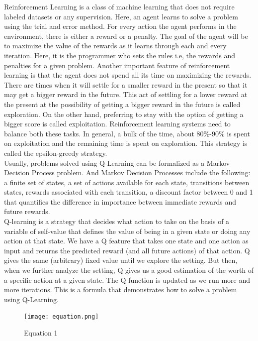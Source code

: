 \documentclass[conference]{IEEEtran}
\begin{document}
Reinforcement Learning is a class of machine learning that does not require labeled datasets or any supervision. Here, an agent learns to solve a problem using the trial and error method. For every action the agent performs in the environment, there is either a reward or a penalty. The goal of the agent will be to maximize the value of the rewards as it learns through each and every iteration. Here, it is the programmer who sets the rules i.e, the rewards and penalties for a given problem. Another important feature of reinforcement learning is that the agent does not spend all its time on maximizing the rewards. There are times when it will settle for a smaller reward in the present so that it may get a bigger reward in the future. This act of settling for a lower reward at the present at the possibility of getting a bigger reward in the future is called exploration. On the other hand, preferring to stay with the option of getting a bigger score is called exploitation. Reinforcement learning systems need to balance both these tasks. In general, a bulk of the time, about 80\%-90\% is spent on exploitation and the remaining time is spent on exploration. This strategy is called the epsilon-greedy strategy. 
\\
Usually, problems solved using Q-Learning can be formalized as a Markov Decision Process problem. And Markov Decision Processes include the following: a finite set of states, a set of actions available for each state, transitions between states, rewards associated with each transition, a discount factor between 0 and 1 that quantifies the difference in importance between immediate rewards and future rewards. 
\\
Q-learning is a strategy that decides what action to take on the basis of a variable of self-value that defines the value of being in a given state or doing any action at that state. We have a Q feature that takes one state and one action as input and returns the predicted reward (and all future actions) of that action. Q gives the same (arbitrary) fixed value until we explore the setting. But then, when we further analyze the setting, Q gives us a good estimation of the worth of a specific action at a given state. The Q function is updated as we run more and more iterations. This is a formula that demonstrates how to solve a problem using Q-Learning.
\\

\begin{figure}[htbp]
\centerline{\texttt{[image: equation.png]}}
\caption{Equation 1}
\end{figure}
\end{document}
